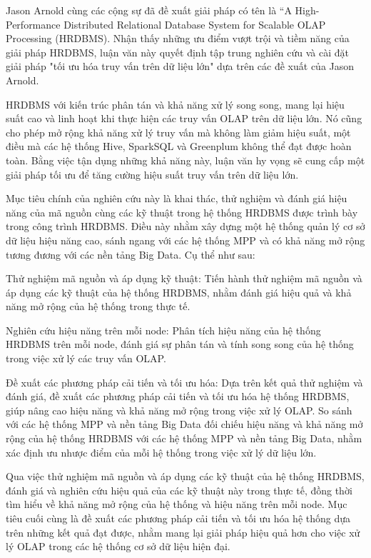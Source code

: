 \documentclass{article}[14pt]
\begin{document}
{Jason Arnold cùng các cộng sự đã đề xuất giải pháp có tên là “A High-Performance Distributed Relational Database System for Scalable OLAP Processing (HRDBMS)\cite{arnold2019hrdbms}. Nhận thấy những ưu điểm vượt trội và tiềm năng của giải pháp HRDBMS, luận văn này quyết định tập trung nghiên cứu và cài đặt giải pháp "tối ưu hóa truy vấn trên dữ liệu lớn" dựa trên các đề xuất của Jason Arnold.

HRDBMS với kiến trúc phân tán và khả năng xử lý song song, mang lại hiệu suất cao và linh hoạt khi thực hiện các truy vấn OLAP trên dữ liệu lớn. Nó cũng cho phép mở rộng khả năng xử lý truy vấn mà không làm giảm hiệu suất, một điều mà các hệ thống Hive, SparkSQL và Greenplum không thể đạt được hoàn toàn. Bằng việc tận dụng những khả năng này, luận văn hy vọng sẽ cung cấp một giải pháp tối ưu để tăng cường hiệu suất truy vấn trên dữ liệu lớn.

Mục tiêu chính của nghiên cứu này là khai thác, thử nghiệm và đánh giá hiệu năng của mã nguồn cùng các kỹ thuật trong hệ thống HRDBMS được trình bày trong công trình HRDBMS. Điều này nhằm xây dựng một hệ thống quản lý cơ sở dữ liệu hiệu năng cao, sánh ngang với các hệ thống MPP và có khả năng mở rộng tương đương với các nền tảng Big Data. Cụ thể như sau:

Thử nghiệm mã nguồn và áp dụng kỹ thuật: Tiến hành thử nghiệm mã nguồn và áp dụng các kỹ thuật của hệ thống HRDBMS, nhằm đánh giá hiệu quả và khả năng mở rộng của hệ thống trong thực tế.

Nghiên cứu hiệu năng trên mỗi node: Phân tích hiệu năng của hệ thống HRDBMS trên mỗi node, đánh giá sự phân tán và tính song song của hệ thống trong việc xử lý các truy vấn OLAP.

Đề xuất các phương pháp cải tiến và tối ưu hóa: Dựa trên kết quả thử nghiệm và đánh giá, đề xuất các phương pháp cải tiến và tối ưu hóa hệ thống HRDBMS, giúp nâng cao hiệu năng và khả năng mở rộng trong việc xử lý OLAP.
So sánh với các hệ thống MPP và nền tảng Big Data đối chiếu hiệu năng và khả năng mở rộng của hệ thống HRDBMS với các hệ thống MPP và nền tảng Big Data, nhằm xác định ưu nhược điểm của mỗi hệ thống trong việc xử lý dữ liệu lớn.

Qua việc thử nghiệm mã nguồn và áp dụng các kỹ thuật của hệ thống HRDBMS, đánh giá và nghiên cứu hiệu quả của các kỹ thuật này trong thực tế, đồng thời tìm hiểu về khả năng mở rộng của hệ thống và hiệu năng trên mỗi node. Mục tiêu cuối cùng là đề xuất các phương pháp cải tiến và tối ưu hóa hệ thống dựa trên những kết quả đạt được, nhằm mang lại giải pháp hiệu quả hơn cho việc xử lý OLAP trong các hệ thống cơ sở dữ liệu hiện đại.

}
\end{document}

